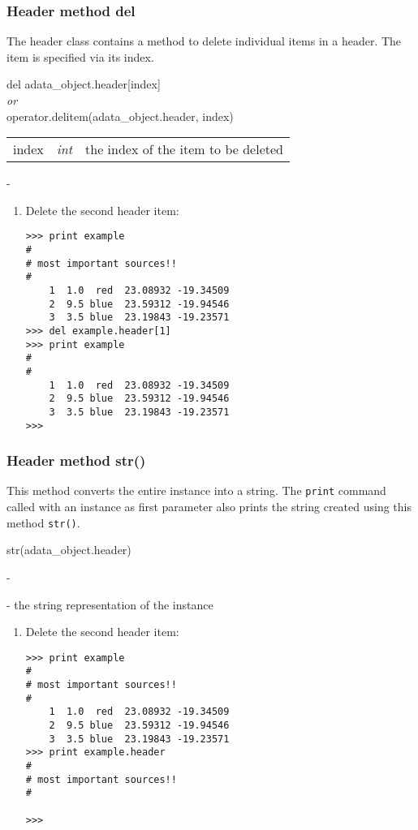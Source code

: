 \subsubsection{Header method del}
\label{ahe_del}
%
The header class contains a method to delete individual items in a header.
The item is specified via its index.

del adata\_object.header[index]\\
{\it or}\\
operator.delitem(adata\_object.header, index)

\begin{tabular}{lcl}
index &{\it int}& the index of the item to be deleted\\
\end{tabular}

-

\begin{enumerate}
\item Delete the second header item:
\begin{small}
\begin{verbatim}
>>> print example
#
# most important sources!!
#
    1  1.0  red  23.08932 -19.34509
    2  9.5 blue  23.59312 -19.94546
    3  3.5 blue  23.19843 -19.23571
>>> del example.header[1]
>>> print example
#
#
    1  1.0  red  23.08932 -19.34509
    2  9.5 blue  23.59312 -19.94546
    3  3.5 blue  23.19843 -19.23571
>>>
\end{verbatim}
\end{small}
\end{enumerate}

\subsubsection{Header method str()}
\label{ahe_str}
%
This method converts the entire \ah instance into a string. The {\tt print}
command called with an \ah instance as first parameter also prints the
string created using this method {\tt str()}.

str(adata\_object.header)

-

- the string representation of the \ah instance

\begin{enumerate}
\item Delete the second header item:
\begin{small}
\begin{verbatim}
>>> print example
#
# most important sources!!
#
    1  1.0  red  23.08932 -19.34509
    2  9.5 blue  23.59312 -19.94546
    3  3.5 blue  23.19843 -19.23571
>>> print example.header
#
# most important sources!!
#

>>>
\end{verbatim}
\end{small}
\end{enumerate}

